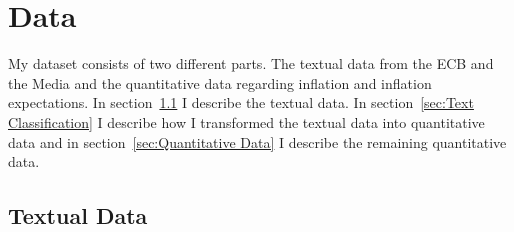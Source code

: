 \documentclass[review]{elsarticle}
\begin{document}
\section{Data} \label{sec:Data}

My dataset consists of two different parts. The textual data from the ECB and the Media and the quantitative data regarding inflation and inflation expectations. In  section~\ref{sec:Textual Data} I describe the textual data. In section~\ref{sec:Text Classification} I describe how I transformed the textual data into quantitative data and in section~\ref{sec:Quantitative Data} I describe the remaining quantitative data.

\subsection{Textual Data} \label{sec:Textual Data}
\end{document}
